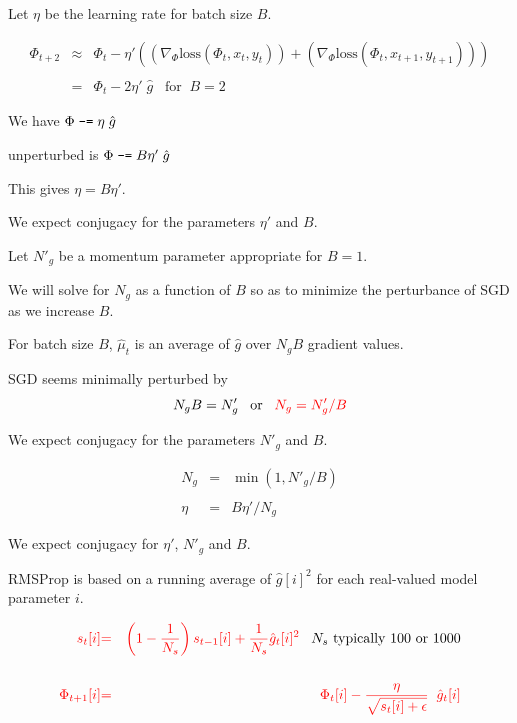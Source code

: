 {

Let $\eta$ be the learning rate for batch size $B$.

\vfill
\begin{eqnarray*}
  \Phi_{t+2} & \approx & \Phi_t - \eta'((\nabla_\Phi \mathrm{loss}(\Phi_t,x_t,y_t)) + (\nabla_\Phi \mathrm{loss}(\Phi_t,x_{t+1},y_{t+1}))) \\
  \\
  & = & \Phi_t - 2\eta'\;\hat{g}\;\;\;\mathrm{for}\;\;B=2
\end{eqnarray*}

\vfill
We have {\color{red} $\Phi \;\mbox{\tt -=} \; \eta\;\hat{g}$}

\vfill
unperturbed is {\color{red} $\Phi \;\mbox{\tt -=} \; B\eta'\;\hat{g}$}

\vfill
This gives {\color{red} $\eta = B \eta'$}.

\vfill
We expect conjugacy for the parameters $\eta'$ and $B$.


Let $N'_g$ be a momentum parameter appropriate for $B=1$.

\vfill
We will solve for $N_g$ as a function of $B$ so as to minimize the perturbance of SGD as we increase $B$.

\vfill
For batch size $B$, $\hat{\mu}_t$ is an average of $\hat{g}$ over $N_gB$ gradient values.

\vfill
SGD seems minimally perturbed by
$$N_gB = N'_g\;\;\;\mbox{or}\;\;\;{\color{red} N_g = N'_g/B}$$

\vfill
We expect conjugacy for the parameters $N'_g$ and $B$.


{\color{red}
\begin{eqnarray*}
N_g & = & \min(1,N'_g/B) \\
\\
\eta & = & B\eta'/N_g
\end{eqnarray*}
}

\vfill
We expect conjugacy for $\eta'$, $N'_g$ and $B$.


RMSProp is based on a running average of $\hat{g}[i]^2$ for each real-valued model parameter $i$.

\begin{eqnarray*}
{\color{red} s_t[i]} & {\color{red} =} & {\color{red} \left(1-\frac{1}{N_s}\right) s_{t-1}[i] + \frac{1}{N_s} \hat{g}_t[i]^2}\;\;\;\mbox{$N_s$ typically 100 or 1000} \\
\\
{\color{red} \Phi_{t+1}[i]} & {\color{red} =} & {\color{red} \Phi_t[i] - \frac{\eta}{\sqrt{s_t[i] + \epsilon}}\;\; \hat{g}_t[i]}
\end{eqnarray*}


}
